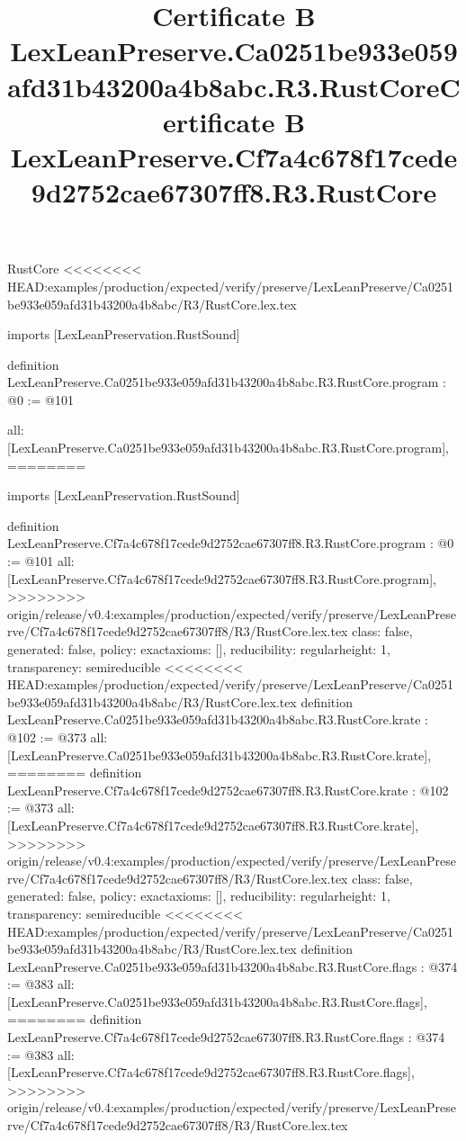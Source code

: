 \begin{lexlean}{RustCore}
<<<<<<<< HEAD:examples/production/expected/verify/preserve/LexLeanPreserve/Ca0251be933e059afd31b43200a4b8abc/R3/RustCore.lex.tex
\title{Certificate B LexLeanPreserve.Ca0251be933e059afd31b43200a4b8abc.R3.RustCore}
\begin{coremodule}
imports [LexLeanPreservation.RustSound]

definition LexLeanPreserve.Ca0251be933e059afd31b43200a4b8abc.R3.RustCore.program : @0 := @101 {
  all: [LexLeanPreserve.Ca0251be933e059afd31b43200a4b8abc.R3.RustCore.program],
========
\title{Certificate B LexLeanPreserve.Cf7a4c678f17cede9d2752cae67307ff8.R3.RustCore}
\begin{coremodule}
imports [LexLeanPreservation.RustSound]

definition LexLeanPreserve.Cf7a4c678f17cede9d2752cae67307ff8.R3.RustCore.program : @0 := @101 {
  all: [LexLeanPreserve.Cf7a4c678f17cede9d2752cae67307ff8.R3.RustCore.program],
>>>>>>>> origin/release/v0.4:examples/production/expected/verify/preserve/LexLeanPreserve/Cf7a4c678f17cede9d2752cae67307ff8/R3/RustCore.lex.tex
  class: false,
  generated: false,
  policy: exact{axioms: []},
  reducibility: regular{height: 1},
  transparency: semireducible
}
<<<<<<<< HEAD:examples/production/expected/verify/preserve/LexLeanPreserve/Ca0251be933e059afd31b43200a4b8abc/R3/RustCore.lex.tex
definition LexLeanPreserve.Ca0251be933e059afd31b43200a4b8abc.R3.RustCore.krate : @102 := @373 {
  all: [LexLeanPreserve.Ca0251be933e059afd31b43200a4b8abc.R3.RustCore.krate],
========
definition LexLeanPreserve.Cf7a4c678f17cede9d2752cae67307ff8.R3.RustCore.krate : @102 := @373 {
  all: [LexLeanPreserve.Cf7a4c678f17cede9d2752cae67307ff8.R3.RustCore.krate],
>>>>>>>> origin/release/v0.4:examples/production/expected/verify/preserve/LexLeanPreserve/Cf7a4c678f17cede9d2752cae67307ff8/R3/RustCore.lex.tex
  class: false,
  generated: false,
  policy: exact{axioms: []},
  reducibility: regular{height: 1},
  transparency: semireducible
}
<<<<<<<< HEAD:examples/production/expected/verify/preserve/LexLeanPreserve/Ca0251be933e059afd31b43200a4b8abc/R3/RustCore.lex.tex
definition LexLeanPreserve.Ca0251be933e059afd31b43200a4b8abc.R3.RustCore.flags : @374 := @383 {
  all: [LexLeanPreserve.Ca0251be933e059afd31b43200a4b8abc.R3.RustCore.flags],
========
definition LexLeanPreserve.Cf7a4c678f17cede9d2752cae67307ff8.R3.RustCore.flags : @374 := @383 {
  all: [LexLeanPreserve.Cf7a4c678f17cede9d2752cae67307ff8.R3.RustCore.flags],
>>>>>>>> origin/release/v0.4:examples/production/expected/verify/preserve/LexLeanPreserve/Cf7a4c678f17cede9d2752cae67307ff8/R3/RustCore.lex.tex
}}}
\end{coremodule}}
\end{coremodule}
\end{lexlean}

